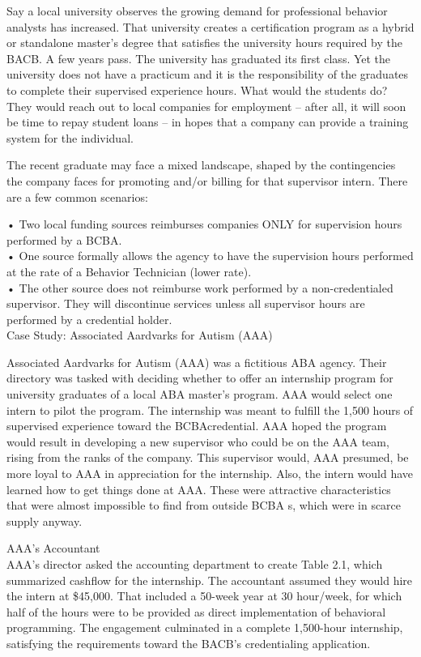 Say a local university observes the growing demand for professional behavior analysts has increased. That university creates a certification program as a hybrid or standalone master's degree that satisfies the university hours required by the BACB. A few years pass. The university has graduated its first class. Yet the university does not have a practicum and it is the responsibility of the graduates to complete their supervised experience hours. What would the students do? They would reach out to local companies for employment – after all, it will soon be time to repay student loans – in hopes that a company can provide a training system for the individual.

The recent graduate may face a mixed landscape, shaped by the contingencies the company faces for promoting and/or billing for that supervisor intern. There are a few common scenarios:

    • Two local funding sources reimburses companies ONLY for supervision hours performed by a BCBA.\\
    •  One source formally allows the agency to have the supervision hours performed at the rate of a Behavior Technician (lower rate).\\
    • The other source does not reimburse work performed by a non-credentialed supervisor. They will discontinue services unless all supervisor hours are performed by a credential holder.\\

Case Study: Associated Aardvarks for Autism (AAA)

Associated Aardvarks for Autism (AAA) was a fictitious ABA agency. Their directory was tasked with deciding whether to offer an internship program for university graduates of a local ABA master's program. AAA would select one intern to pilot the program. The internship was meant to fulfill the 1,500 hours of supervised experience toward the BCBA\textregistered credential. AAA hoped the program would result in developing a new supervisor who could be on the AAA team, rising from the ranks of the company. This supervisor would, AAA presumed, be more loyal to AAA in appreciation for the internship. Also, the intern would have learned how to get things done at AAA. These were attractive characteristics that were almost impossible to find from outside BCBA\textregistered
s, which were in scarce supply anyway. 

AAA's Accountant\\
AAA's director asked the accounting department to create Table 2.1, which summarized cashflow for the internship. The accountant assumed they would hire the intern at \$45,000. That included a 50-week year at 30 hour/week, for which half of the hours were to be provided as direct implementation of behavioral programming. The engagement culminated in a complete 1,500-hour internship, satisfying the requirements toward the BACB\textregistered's credentialing application. 

